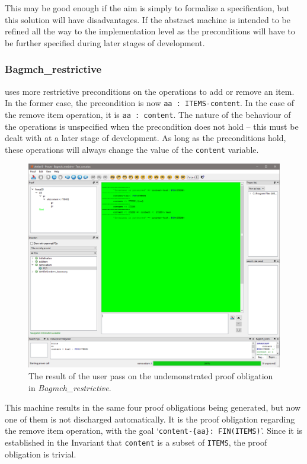 \documentclass[12pt,journal,duplex]{IEEEtran}
\begin{document}
	 This may be good enough if the aim is simply to formalize a specification, but this solution will have disadvantages. If the abstract machine is intended to be refined all the way to the implementation level as the preconditions will have to be further specified during later stages of development.

	\subsubsection{Bagmch\_restrictive} uses more restrictive preconditions on the operations to add or remove an item. In the former case, the precondition is now \texttt{aa~:~ITEMS-content}. In the case of the remove item operation, it is \texttt{aa : content}. The nature of the behaviour of the operations is unspecified when the precondition does not hold -- this must be dealt with at a later stage of development. As long as the preconditions hold, these operations will always change the value of the \texttt{content} variable.
		\begin{figure}
		\centering
		\includegraphics[scale=0.5]{bagmch_restrictive_ip.png}
		\caption{The result of the user pass on the undemonstrated proof obligation in  \emph{Bagmch\_restrictive}.}

	\end{figure}
	This machine results in the same four proof obligations being generated, but now one of them is not discharged automatically. It is the proof obligation regarding the remove item operation, with the goal `\texttt{content-\{aa\}: FIN(ITEMS)}'. Since it is established in the Invariant that \texttt{content} is a subset of \texttt{ITEMS}, the proof obligation is trivial.
\end{document}
